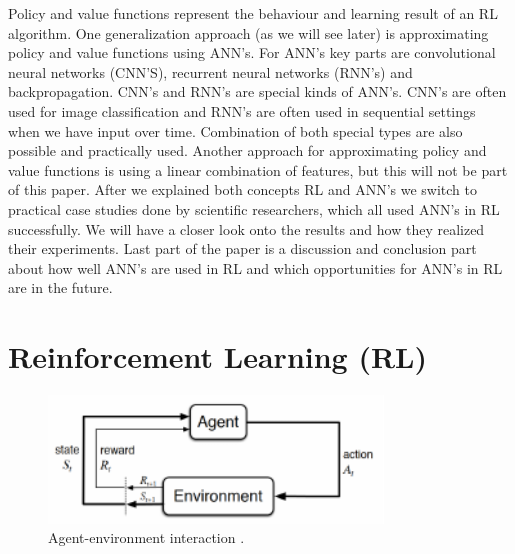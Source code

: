 \documentclass[conference]{IEEEtran}
\begin{document}
Policy and value functions represent the behaviour and learning result of an RL algorithm. One generalization approach (as we will see later) is approximating policy and value functions using ANN's. For ANN's key parts are convolutional neural networks (CNN'S), recurrent neural networks (RNN's) and backpropagation. CNN's and RNN's are special kinds of ANN's. CNN's are often used for image classification and RNN's are often used in sequential settings when we have input over time. Combination of both special types are also possible and practically used. Another approach for approximating policy and value functions is using a linear combination of features, but this will not be part of this paper. After we explained both concepts RL and ANN's we switch to practical case studies done by scientific researchers, which all used ANN's in RL successfully. We will have a closer look onto the results and how they realized their experiments. Last part of the paper is a discussion and conclusion part about how well ANN's are used in RL and which opportunities for ANN's in RL are in the future.  

\section{Reinforcement Learning (RL)}

\begin{figure}[!t]
\centering
\includegraphics[width=3.5in]{agent_environment}
\caption{Agent-environment interaction \cite{sutton_barto_98}.}
\label{fig:agent_environment}
\end{figure}
\end{document}
